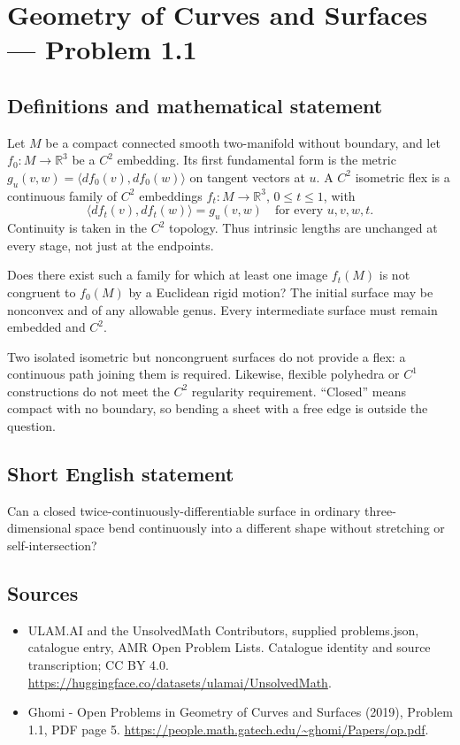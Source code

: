 \documentclass[11pt,a4paper]{article}
\begin{document}
\section*{Geometry of Curves and Surfaces — Problem 1.1}\label{statement}

\subsection{Definitions and mathematical statement}
Let $M$ be a compact connected smooth two-manifold without boundary,
and let $f_0:M\to\mathbb R^3$ be a $C^2$ embedding. Its first
fundamental form is the metric
$g_u(v,w)=\langle df_0(v),df_0(w)\rangle$ on tangent vectors at $u$.
A $C^2$ isometric flex is a continuous family of $C^2$ embeddings
$f_t:M\to\mathbb R^3$, $0\le t\le1$, with
\[
       \langle df_t(v),df_t(w)\rangle=g_u(v,w)
       \quad\text{for every }u,v,w,t.
\]
Continuity is taken in the $C^2$ topology. Thus intrinsic lengths
are unchanged at every stage, not just at the endpoints.

Does there exist such a family for which at least one image
$f_t(M)$ is not congruent to $f_0(M)$ by a Euclidean rigid motion?
The initial surface may be nonconvex and of any allowable genus.
Every intermediate surface must remain embedded and $C^2$.

Two isolated isometric but noncongruent surfaces do not provide a
flex: a continuous path joining them is required. Likewise,
flexible polyhedra or $C^1$ constructions do not meet the $C^2$
regularity requirement. ``Closed'' means compact with no boundary,
so bending a sheet with a free edge is outside the question.
\subsection{Short English statement}
Can a closed twice-continuously-differentiable surface in ordinary
three-dimensional space bend continuously into a different shape
without stretching or self-intersection?
\subsection{Sources}
\begin{itemize}
\item[S1] ULAM.AI and the UnsolvedMath Contributors, supplied problems.json, catalogue entry, AMR Open Problem Lists. Catalogue identity and source transcription; CC BY 4.0.
\url{https://huggingface.co/datasets/ulamai/UnsolvedMath}.
\item[S2] Ghomi - Open Problems in Geometry of Curves and Surfaces (2019), Problem 1.1, PDF page 5. 
\url{https://people.math.gatech.edu/~ghomi/Papers/op.pdf}.
\end{itemize}
\end{document}
